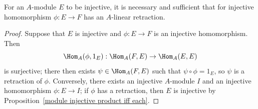 \begin{corollary}\label{module injective iff homo has retracton}
For an $A$-module $E$ to be injective, it is necessary and sufficient that for injective homomorphism $\phi:E\to F$ has an $A$-linear retraction.
\end{corollary}
\begin{proof}
Suppose that $E$ is injective and $\phi:E\to F$ is an injective homomorphism. Then
\[\Hom_A(\phi,1_E):\Hom_A(F,E)\to\Hom_A(E,E)\]
is surjective; there then exists $\psi\in\Hom_A(F,E)$ such that $\psi\circ\phi=1_E$, so $\psi$ is a retraction of $\phi$. Conversely, there exists an injective $A$-module $I$ and an injective homomorphism $\phi:E\to I$; if $\phi$ has a retraction, then $E$ is injective by Proposition~\ref{module injective product iff each}.
\end{proof}
